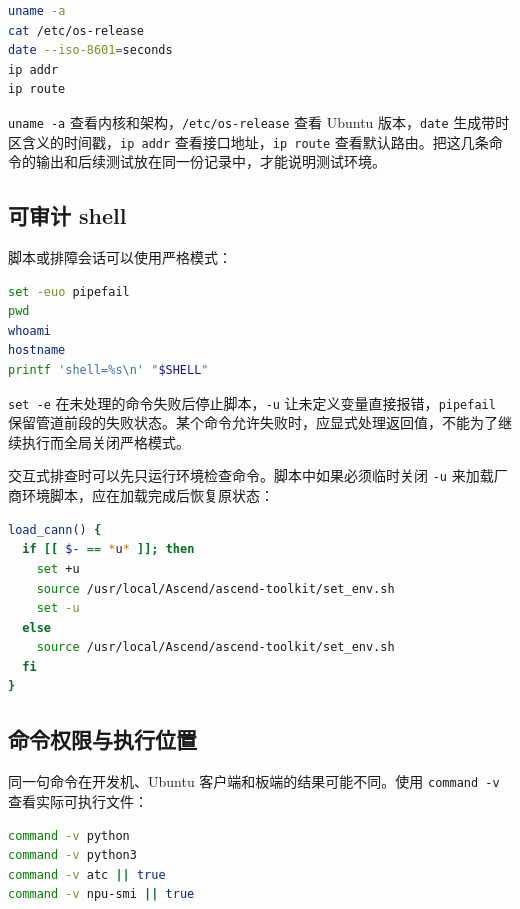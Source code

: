 \begin{lstlisting}[language=bash]
uname -a
cat /etc/os-release
date --iso-8601=seconds
ip addr
ip route
\end{lstlisting}

\passthrough{\lstinline!uname -a!}
查看内核和架构，\passthrough{\lstinline!/etc/os-release!} 查看 Ubuntu
版本，\passthrough{\lstinline!date!}
生成带时区含义的时间戳，\passthrough{\lstinline!ip addr!}
查看接口地址，\passthrough{\lstinline!ip route!}
查看默认路由。把这几条命令的输出和后续测试放在同一份记录中，才能说明测试环境。

\subsection{可审计 shell}\label{ux53efux5ba1ux8ba1-shell}

脚本或排障会话可以使用严格模式：

\begin{lstlisting}[language=bash]
set -euo pipefail
pwd
whoami
hostname
printf 'shell=%s\n' "$SHELL"
\end{lstlisting}

\passthrough{\lstinline!set -e!}
在未处理的命令失败后停止脚本，\passthrough{\lstinline!-u!}
让未定义变量直接报错，\passthrough{\lstinline!pipefail!}
保留管道前段的失败状态。某个命令允许失败时，应显式处理返回值，不能为了继续执行而全局关闭严格模式。

交互式排查时可以先只运行环境检查命令。脚本中如果必须临时关闭
\passthrough{\lstinline!-u!}
来加载厂商环境脚本，应在加载完成后恢复原状态：

\begin{lstlisting}[language=bash]
load_cann() {
  if [[ $- == *u* ]]; then
    set +u
    source /usr/local/Ascend/ascend-toolkit/set_env.sh
    set -u
  else
    source /usr/local/Ascend/ascend-toolkit/set_env.sh
  fi
}
\end{lstlisting}

\subsection{命令权限与执行位置}\label{ux547dux4ee4ux6743ux9650ux4e0eux6267ux884cux4f4dux7f6e}

同一句命令在开发机、Ubuntu 客户端和板端的结果可能不同。使用
\passthrough{\lstinline!command -v!} 查看实际可执行文件：

\begin{lstlisting}[language=bash]
command -v python
command -v python3
command -v atc || true
command -v npu-smi || true
\end{lstlisting}

